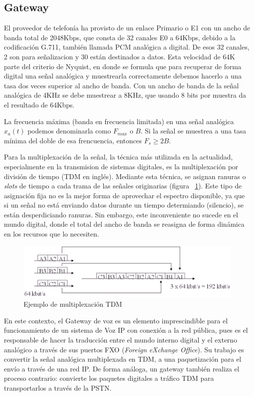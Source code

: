 \documentclass[a4paper, 12pt]{book}
\begin{document}
\subsection{Gateway}
\label{sec:gateway}

El proveedor de telefonía ha provisto de un enlace Primario o E1 con un ancho de banda total de 2048Kbps, que consta de 32 canales E0 a 64Kbps, debido a la codificación G.711, también llamada PCM analógica a digital. De esos 32 canales, 2 son para señalizacion y 30 están destinados a datos. 
Esta velocidad de 64K parte del criterio de Nyquist, en donde se formula que para recuperar de forma digital una señal analógica y muestrearla correctamente debemos hacerlo a una tasa dos veces superior al ancho de banda. 
Con un ancho de banda de la señal analógica de 4KHz se debe muestrear a 8KHz, que usando 8 bits por muestra da el resultado de 64Kbps. 

La frecuencia máxima (banda en frecuencia limitada) en una señal analógica $x_{a}(t)$ podemos denominarla como $F_{max}$  o $B$. Si la señal se muestrea a una tasa mínima del doble de esa frencuencia, entonces $F_{s} \geq 2B$.

Para la multiplexación de la señal, la técnica más utilizada en la actualidad, especialmente en la transmision de sistemas digitales, es la multiplexación por división de tiempo (TDM en inglés). Mediante esta técnica, se asignan ranuras o \emph{slots} de tiempo a cada trama de las señales originarias (figura ~\ref{figura:fig_tdm}). Este tipo de asignación fija no es la mejor forma de aprovechar el espectro disponible, ya que si un señal no está enviando datos durante un tiempo determiando (silencio), se están desperdiciando ranuras. Sin embargo, este inconveniente no sucede en el mundo digital, donde el total del ancho de banda se reasigna de forma dinámica en los recursos que lo necesiten.

\begin{figure}
  \centering
  \includegraphics[scale=0.7]{img/fig_tdm}
  \caption{Ejemplo de multiplexación TDM}
  \label{figura:fig_tdm}
\end{figure}

En este contexto, el Gateway de voz es un elemento imprescindible para el funcionamiento de un sistema de Voz IP con conexión a la red pública, pues es el responsable de hacer la traducción entre el mundo interno digital y el externo analógico a través de sus puertos FXO (\emph{Foreign eXchange Office}). Su trabajo es convertir la señal analógica multiplexada en TDM, a una paquetización para el envío a través de una red IP. De forma análoga, un gateway también realiza el proceso contrario: convierte los paquetes digitales a tráfico TDM para transportarlos a través de la PSTN.
\end{document}
